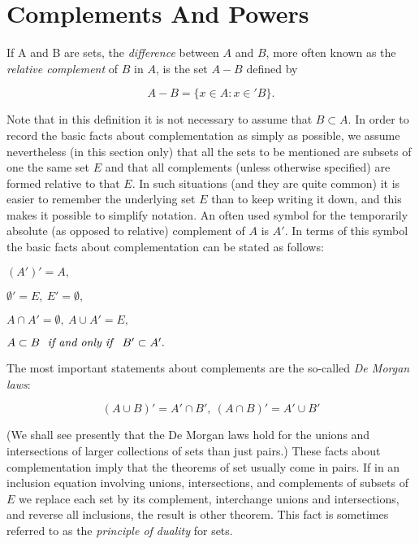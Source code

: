 
\chapter{Complements And Powers} 

If A and B are sets, the \textit{difference} between $A$ and $B$, more often known as the \textit{relative complement} of $B$ in $A$, is the set $A - B$ defined by 

\begin{equation*}
A - B = \{ x \in A: x \in ' B \}.
\end{equation*}

Note that in this definition it is not necessary to assume that $B \subset A$. In order to record the basic facts about complementation as simply as possible, we assume nevertheless (in this section only) that all the sets to be mentioned are subsets of one the same set $E$ and that all complements (unless otherwise specified) are formed relative to that $E$. In such situations (and they are quite common) it is easier to remember the underlying set $E$ than to keep writing it down, and this makes it possible to simplify notation. An often used symbol for the temporarily absolute (as opposed to relative) complement of $A$ is $A'$. In terms of this symbol the basic facts about complementation can be stated as follows:

\begin{center}
$(A')' = A,$

$\emptyset ' = E, \: E' = \emptyset ,$

$ A \cap A' = \emptyset, \: A \cup A' = E,$

$A \subset B \text{ \textit{ if and only if } } B' \subset A'.$
\end{center}

The most important statements about complements are the so-called \textit{De Morgan laws}:

\begin{equation*}
(A \cup B)' = A' \cap B', \: (A \cap B)' = A' \cup B'
\end{equation*}

(We shall see presently that the De Morgan laws hold for the unions and intersections of larger collections of sets than just pairs.) These facts about complementation imply that the theorems of set usually come in pairs. If in an inclusion equation involving unions, intersections, and complements of subsets of $E$ we replace each set by its complement, interchange unions and intersections, and reverse all  inclusions, the result is other theorem. This fact is sometimes referred to as the \textit{principle of duality} for sets.

